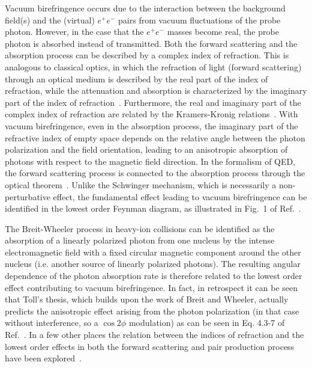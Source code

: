 \documentclass[12pt,epjc3]{svjour3}\sloppy
\begin{document}
Vacuum birefringence occurs due to the interaction between the background field(s) and the (virtual) $e^+e^-$ pairs from vacuum fluctuations of the probe photon. 
However, in the case that the $e^+e^-$ masses become real, the probe photon is absorbed instead of transmitted. 
Both the forward scattering and the absorption process can be described by a complex index of refraction.  
This is analogous to classical optics, in which the refraction of light (forward scattering) through an optical medium is described by the real part of the index of refraction, while the  attenuation and absorption is characterized by the imaginary part of the index of refraction~\cite{hechtOptics2015,jacksonClassicalElectrodynamics1975}. Furthermore, the real and imaginary part of the complex index of refraction are related by the Kramers-Kronig relations~\cite{kronigTheoryDispersionXRays1926,DISPERSIONRELATIONLIGHT}.
With vacuum birefringence, even in the absorption process, the imaginary part of the refractive index of empty space depends on the relative angle between the photon polarization and the field orientation, leading to an anisotropic absorption of photons with respect to the magnetic field direction.
In the formalism of QED, the forward scattering process is connected to the absorption process through the optical theorem~\cite{budnev_two-photon_1975}.
Unlike the Schwinger mechanism, which is necessarily a non-perturbative effect, the fundamental effect leading to vacuum birefringence can be identified in the lowest order Feynman diagram, as illustrated in Fig.~1 of Ref.~\cite{vallePVLASExperimentMeasuring2016}. 

The Breit-Wheeler process in heavy-ion collisions can be identified as the absorption of a linearly polarized photon from one nucleus by the intense electromagnetic field with a fixed circular magnetic component around the other nucleus (i.e. another source of linearly polarized photons). 
The resulting angular dependence of the photon absorption rate is therefore related to the lowest order effect contributing to vacuum birefringence\cite{hattoriVacuumBirefringenceStrong2013,Mignani:2016fwz}. 
In fact, in retrospect it can be seen that Toll's thesis, which builds upon the work of Breit and Wheeler, actually predicts the anisotropic effect arising from the photon polarization (in that case without interference, so a $\cos2\phi$ modulation) as can be seen in Eq. 4.3-7 of Ref.~\cite{DISPERSIONRELATIONLIGHT}. In a few other places the relation between the indices of refraction and the lowest order effects in both the forward scattering and pair production process have been explored~\cite{dinuVacuumRefractiveIndices2014,dinuPhotonPolarisationLightbylight2014}.
 
\end{document}
